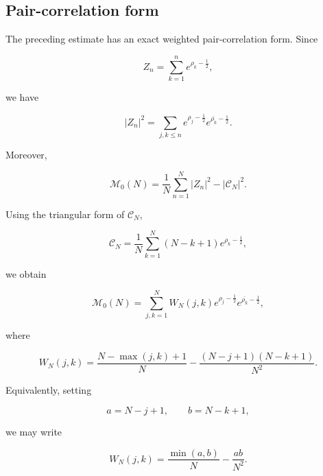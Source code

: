 \documentclass[11pt]{amsart}
\numberwithin{equation}{section}
\theoremstyle{plain}
\theoremstyle{definition}
\theoremstyle{remark}
\begin{document}
\subsection{Pair-correlation form}
\label{subsec:M0_pair_correlation_form}

The preceding estimate has an exact weighted pair-correlation form. Since

\begin{equation}
Z_n
=
\sum_{k=1}^{n}e^{\rho_k-\frac12},
\label{eq:Zn_prefix_for_pair_form}
\end{equation}

we have

\begin{equation}
|Z_n|^2
=
\sum_{j,k\leq n}
e^{\rho_j-\frac12}e^{\overline{\rho_k}-\frac12}.
\label{eq:Zn_square_pair_expansion}
\end{equation}

Moreover,

\begin{equation}
\mathcal M_0(N)
=
\frac1N
\sum_{n=1}^{N}|Z_n|^2
-
|\mathcal C_N|^2.
\label{eq:calM0_uncentered_minus_centroid}
\end{equation}

Using the triangular form of \(\mathcal C_N\),

\begin{equation}
\mathcal C_N
=
\frac1N
\sum_{k=1}^{N}(N-k+1)e^{\rho_k-\frac12},
\label{eq:calC_triangular_form}
\end{equation}

we obtain

\begin{equation}
\mathcal M_0(N)
=
\sum_{j,k=1}^{N}
W_N(j,k)
e^{\rho_j-\frac12}e^{\overline{\rho_k}-\frac12},
\label{eq:calM0_pair_kernel_identity}
\end{equation}

where

\begin{equation}
W_N(j,k)
=
\frac{N-\max(j,k)+1}{N}
-
\frac{(N-j+1)(N-k+1)}{N^2}.
\label{eq:WN_definition}
\end{equation}

Equivalently, setting

\begin{equation}
a=N-j+1,
\qquad
b=N-k+1,
\label{eq:reverse_ordinal_variables_for_WN}
\end{equation}

we may write

\begin{equation}
W_N(j,k)
=
\frac{\min(a,b)}{N}
-
\frac{ab}{N^2}.
\label{eq:WN_brownian_bridge_form}
\end{equation}
\end{document}
